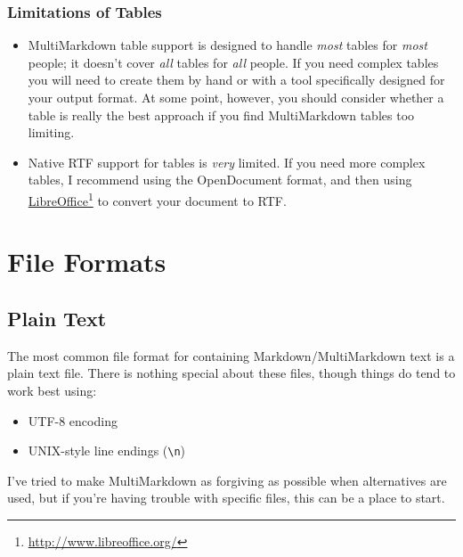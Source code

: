 \subsection{Limitations of Tables}
\label{limitationsoftables}

\begin{itemize}
\item MultiMarkdown table support is designed to handle \emph{most} tables for \emph{most} people; it doesn't cover \emph{all} tables for \emph{all} people. If you need complex tables you will need to create them by hand or with a tool specifically designed for your output format. At some point, however, you should consider whether a table is really the best approach if you find MultiMarkdown tables too limiting.

\item Native RTF support for tables is \emph{very} limited. If you need more complex tables, I recommend using the OpenDocument format, and then using \href{http://www.libreoffice.org/}{LibreOffice}\footnote{\href{http://www.libreoffice.org/}{http:\slash{}\slash{}www.libreoffice.org\slash{}}} to convert your document to RTF.

\end{itemize}

\chapter{File Formats}
\label{fileformats}

\section{Plain Text}
\label{plaintext}

The most common file format for containing Markdown\slash{}MultiMarkdown text is a plain text file. There is nothing special about these files, though things do tend to work best using:

\begin{itemize}
\item UTF-8 encoding

\item UNIX-style line endings (\texttt{\textbackslash{}n})

\end{itemize}

I've tried to make MultiMarkdown as forgiving as possible when alternatives are used, but if you're having trouble with specific files, this can be a place to start.

